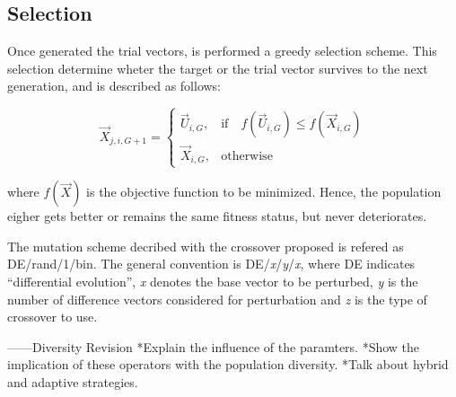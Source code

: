 \subsection{Selection}
Once generated the trial vectors, is performed a greedy selection scheme.
%
This selection determine wheter the target or the trial vector survives to the next generation, and is described as follows:

\begin{equation}
\vec{X}_{j,i,G+1}= 
\begin{cases}
    \vec{U}_{i,G},& \text{if} \quad f(\vec{U}_{i,G}) \leq f(\vec{X}_{i,G})  \\
    \vec{X}_{i,G},              & \text{otherwise}
\end{cases}
\end{equation}

where $f(\vec{X})$ is the objective function to be minimized.
%
Hence, the population eigher gets better or remains the same fitness status, but never deteriorates.

The mutation scheme decribed with the crossover proposed is refered as DE/rand/1/bin.
%
The general convention is DE/\textit{x}/\textit{y}/\textit{x}, where DE indicates ``differential evolution'', \textit{x} denotes the base vector to be perturbed, \textit{y} is the number of difference vectors considered for perturbation and \textit{z} is the type of crossover to use.

------Diversity Revision
*Explain the influence of the paramters.
*Show the implication of these operators with the population diversity.
*Talk about hybrid and adaptive strategies.

